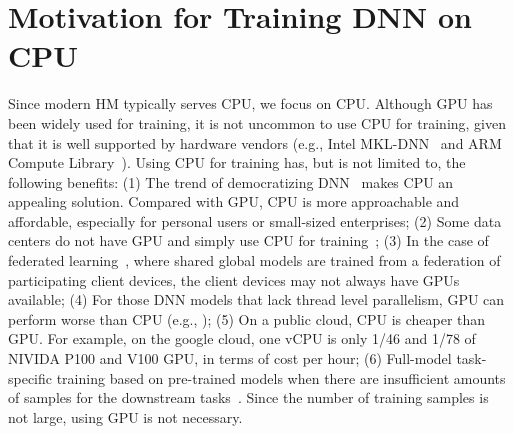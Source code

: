 \section{Motivation for Training DNN on CPU}
\label{sec:motivation}

Since modern HM typically serves CPU, we focus on CPU. 
\textcolor{check}{Although GPU has been widely used for training, it is not uncommon to use CPU for training, given that it is well supported by hardware vendors }
(e.g., Intel MKL-DNN~\cite{intelMKL} and ARM Compute Library~\cite{arm_cl}). \textcolor{jie}{Using CPU for training has, but is not limited to, the following benefits:} (1) The trend of democratizing DNN~\cite{democratization_ai} makes CPU an appealing solution. Compared with GPU, CPU is more approachable and affordable, especially for personal users or small-sized enterprises; (2) Some data centers do not have GPU and simply use CPU for training~\cite{lbnl_cori, tacc_stampede, 8658402, Kurth:2018:EDL:3291656.3291724, Mathuriya:2018:CUD:3291656.3291743,  tacc_ml_CPU_training}; \textcolor{check}{(3) In the case of federated learning~\cite{konen2016federated}, where shared global models are trained from a federation of participating client devices, the client devices may not always have GPUs available}; (4) For those DNN models that lack thread level parallelism, GPU can perform worse than CPU (e.g., \cite{DBLP:journals/corr/ChengKHSCAACCIA16, Hasselt:2016:DRL:3016100.3016191,mlsys19:chen});
(5) On a public cloud, CPU is cheaper than GPU. For example, on the google cloud, one vCPU is only 1/46 and 1/78 of NIVIDA P100 and V100 GPU, in terms of cost per hour; %
\textcolor{jie}{(6) Full-model task-specific training based on pre-trained models when there are insufficient amounts of samples for the downstream tasks~\cite{devlin2018bert}. Since the number of training samples is not large, using GPU is not necessary.} 


